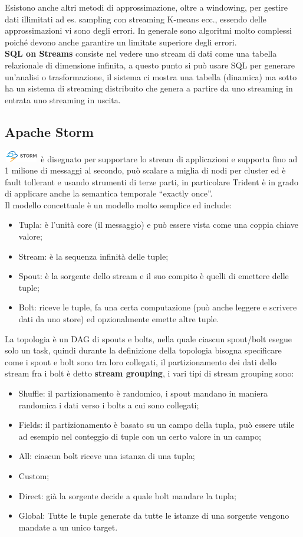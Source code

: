 \documentclass[11pt, twocolumn]{article}
\newenvironment{myitemize}
{ \begin{itemize}[topsep=0ex]
		\setlength{\itemsep}{0pt}
		\setlength{\parskip}{0pt}
		\setlength{\parsep}{0pt}     }
	{ \end{itemize}                  }
\begin{document}
Esistono anche altri metodi di approssimazione, oltre a windowing, per gestire dati illimitati ad es. sampling con streaming K-means ecc., essendo delle approssimazioni vi sono degli errori. 
In generale sono algoritmi molto complessi poiché devono anche garantire un limitate superiore degli errori.\\
\textbf{SQL on Streams} consiste nel vedere uno stream di dati come una tabella relazionale di dimensione infinita, a questo punto si può usare SQL per generare un'analisi o trasformazione, il sistema ci mostra una tabella (dinamica) ma sotto ha un sistema di streaming distribuito che genera a partire da uno streaming in entrata uno streaming in uscita.

\subsection{Apache Storm}
\includegraphics[width=1.5cm,height=0.5cm]{imgs/stormLogo.png} è disegnato per supportare lo stream di applicazioni e supporta fino ad 1 milione di messaggi al secondo, può scalare a miglia di nodi per cluster ed è fault tollerant e usando strumenti di terze parti, in particolare Trident è in grado di applicare anche la semantica temporale ``exactly once''.\\
Il modello concettuale è un modello molto semplice ed include:
\begin{myitemize}
	\item Tupla: è l'unità core (il messaggio) e può essere vista come una coppia chiave valore;
	\item Stream: è la sequenza infinità delle tuple;
	\item Spout: è la sorgente dello stream e il suo compito è quelli di emettere delle tuple;
	\item Bolt: riceve le tuple, fa una certa computazione (può anche leggere e scrivere dati da uno store) ed opzionalmente emette altre tuple.
\end{myitemize}
La topologia è un DAG di spouts e bolts, nella quale ciascun spout/bolt esegue solo un task, quindi durante la definizione della topologia bisogna specificare come i spout e bolt sono tra loro collegati, il partizionamento dei dati dello stream fra i bolt è detto \textbf{stream grouping}, i vari tipi di stream grouping sono:
\begin{myitemize}
	\item Shuffle: il partizionamento è randomico, i spout mandano in maniera randomica i dati verso i bolts a cui sono collegati;
	\item Fields: il partizionamento è basato su un campo della tupla, può essere utile ad esempio nel conteggio di tuple con un certo valore in un campo;
	\item All: ciascun bolt riceve una istanza di una tupla;
	\item Custom;
	\item Direct: già la sorgente decide a quale bolt mandare la tupla;
	\item Global: Tutte le tuple generate da tutte le istanze di una sorgente vengono mandate a un unico target.
\end{myitemize}
\end{document}
